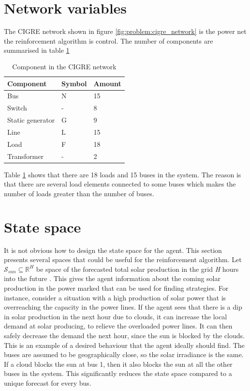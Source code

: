 \documentclass[class=book, crop=false]{standalone}
\begin{document}
\section{Network variables}
The CIGRE network shown in figure \ref{fig:problem:cigre_network} is the power net the reinforcement algorithm is control. The number of components are summarised in table \ref{table:cigre_components}

\begin{table}[ht]
\centering
\caption{Component in the CIGRE network}
\label{table:cigre_components}
\begin{tabular}{l|ll}

Component  & Symbol & Amount 
\\ 
\hline
Bus & N & 15 \\
Switch & - & 8 \\
Static generator & G & 9 \\ 
Line & L & 15 \\
Load & F & 18 \\
Transformer &- & 2

 \\
\hline
\end{tabular}
\end{table}
Table \ref{table:cigre_components} shows that there are 18 loads and 15 buses in the system. The reason is that there are several load elements connected to some buses which makes the number of loads greater than the number of buses.  



\section{State space}
It is not obvious how to design the state space for the agent. This section presents several spaces that could be useful for the reinforcement algorithm. Let $\mathcal{S}_{sun} \subseteq  \mathbb{R}^{H}$ be space of the forecasted total solar production in the grid \textit{H} hours into the future . This gives the agent information about the coming solar production in the power marked that can be used for finding strategies. For instance, consider a situation with a high production of solar power that is overreaching the capacity in the power lines. If the agent sees that there is a dip in solar production in the next hour due to clouds, it can increase the local demand at solar producing, to relieve the overloaded power lines. It can then safely decrease the demand the next hour, since the sun is blocked by the clouds. This is an example of a desired behaviour that the agent ideally should find. The buses are assumed to be geographically close, so the solar irradiance is the same. If a cloud blocks the sun at bus 1, then it also blocks the sun at all the other buses in the system. This significantly reduces the state space compared to a unique forecast for every bus. 
\end{document}
